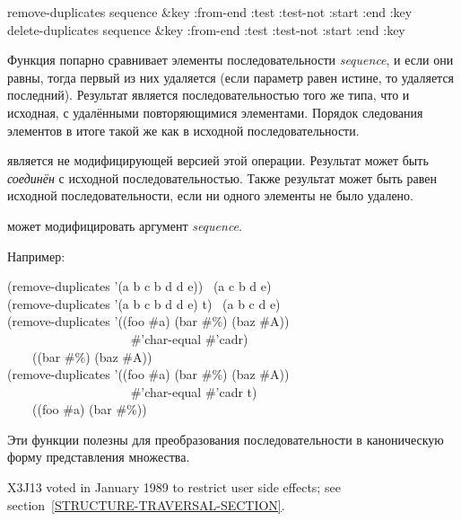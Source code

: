 \begin{defun}[Функция]
remove-duplicates sequence &key :from-end :test :test-not :start :end :key \\
delete-duplicates sequence &key :from-end :test :test-not :start :end :key

Функция попарно сравнивает элементы последовательности \emph{sequence}, и если
они равны, тогда первый из них удаляется (если параметр  равен
истине, то удаляется последний).
Результат является последовательностью того же типа, что и исходная, с
удалёнными повторяющимися элементами. Порядок следования элементов в итоге такой
же как в исходной последовательности.

 является не модифицирующей версией этой операции.
Результат  может быть \emph{соединён} с исходной
последовательностью. Также результат может быть равен  исходной
последовательности, если ни одного элементы не было удалено.

 может модифицировать аргумент \emph{sequence}.

Например:
\begin{lisp}
(remove-duplicates '(a b c b d d e)) \EV\ (a c b d e) \\
(remove-duplicates '(a b c b d d e)  t) \EV\ (a b c d e) \\
(remove-duplicates '((foo \#{\Xbackslash}a) (bar \#{\Xbackslash}\%) (baz \#{\Xbackslash}A)) \\
~~~~~~~~~~~~~~~~~~~ \#'char-equal  \#'cadr) \\
~~~\EV\ ((bar \#{\Xbackslash}\%) (baz \#{\Xbackslash}A)) \\
(remove-duplicates '((foo \#{\Xbackslash}a) (bar \#{\Xbackslash}\%) (baz \#{\Xbackslash}A)) \\
~~~~~~~~~~~~~~~~~~~ \#'char-equal  \#'cadr  t) \\
~~~\EV\ ((foo \#{\Xbackslash}a) (bar \#{\Xbackslash}\%))
\end{lisp}

Эти функции полезны для преобразования последовательности в каноническую форму
представления множества.

\begin{new}
X3J13 voted in January 1989
to restrict user side effects; see section~\ref{STRUCTURE-TRAVERSAL-SECTION}.
\end{new}


\end{defun}
